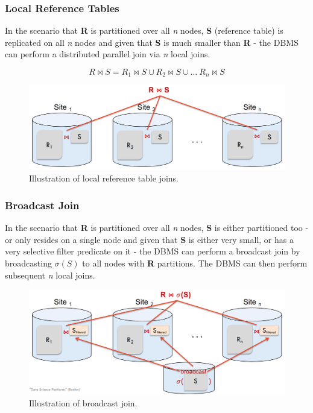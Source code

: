 \subsubsection{Local Reference Tables}
In the scenario that \textbf{R} is partitioned over all \textit{n} nodes, \textbf{S} (reference table) is replicated on all \textit{n} nodes and given that \textbf{S} is much smaller than \textbf{R} - the DBMS can perform a distributed parallel join via \textit{n} local joins.

\begin{equation}
R \Join S = R_1 \Join S \cup R_2 \Join S \cup ...\ R_n \Join S
\end{equation}

\begin{figure}[h]
  \centering
  \includegraphics[width=\linewidth]{figures/local-reference-join.png}
  \caption{Illustration of local reference table joins.}
  \label{fig:local-reference-join}
\end{figure}

\subsubsection{Broadcast Join}
In the scenario that \textbf{R} is partitioned over all \textit{n} nodes, \textbf{S} is either partitioned too - or only resides on a single node and given that \textbf{S} is either very small, or has a very selective filter predicate on it - the DBMS can perform a broadcast join by broadcasting $\sigma(S)$ to all nodes with \textbf{R} partitions. The DBMS can then perform subsequent \textit{n} local joins.

\begin{figure}[h]
  \centering
  \includegraphics[width=\linewidth]{figures/broadcast-join.png}
  \caption{Illustration of broadcast join.}
  \label{fig:broadcast-join}
\end{figure}

